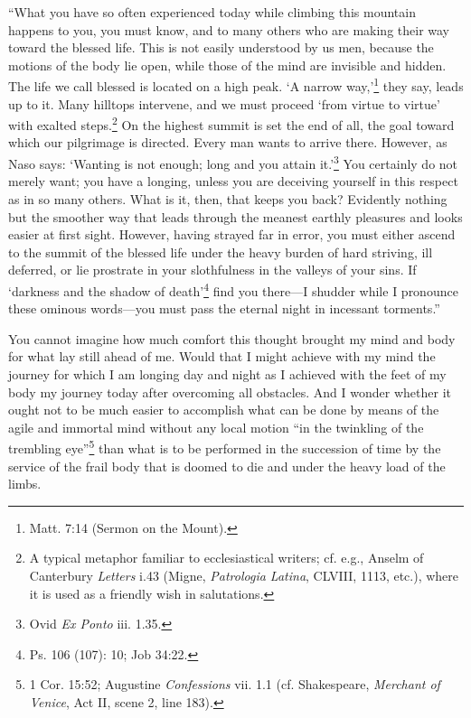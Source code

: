 ``What you have so often experienced today while climbing this
mountain happens to you, you must know, and to many others who are
making their way toward the blessed life. This  is not easily
understood by us men, because the motions of the body lie open, while
those of the mind are invisible and hidden. The life we call blessed
is located on a high peak. `A narrow way,'\footnote{Matt. 7:14 (Sermon
on the Mount).} they say, leads up to it. Many hilltops intervene,
and we must proceed `from virtue to virtue' with exalted
steps.\footnote{A typical metaphor familiar to ecclesiastical writers;
cf. e.g., Anselm of Canterbury \textit{Letters} i.43 (Migne,
\textit{Patrologia Latina}, CLVIII, 1113, etc.), where it is used as a
friendly wish in salutations.} On the highest summit is set the end of
all, the goal toward which our pilgrimage is directed. Every man wants
to arrive there. However, as Naso says: `Wanting is not enough; long
and you attain it.'\footnote{Ovid \textit{Ex Ponto} iii. 1.35.} You
certainly do not merely want; you have a longing, unless you are
deceiving yourself in this respect as in so many others. What is it,
then, that keeps you back? Evidently nothing but the smoother way that
leads through the meanest earthly pleasures and looks easier at first
sight. However, having strayed far in error, you must either ascend to
the summit of the blessed life under the heavy burden of hard
striving, ill deferred, or lie prostrate in your slothfulness in the
valleys of your sins. If `darkness and the shadow of
death'\footnote{Ps. 106 (107): 10; Job 34:22.} find you there---I
shudder while I pronounce these ominous words---you must pass the
eternal night in incessant torments.''

You cannot imagine how much comfort this thought brought my mind and
body for what lay still ahead of me. Would that I might achieve with
my mind the journey for which I am longing day and night as I achieved
with the feet of my body my journey today after overcoming all
obstacles. And I wonder whether it ought not to be much easier to
accomplish what can be done by means of the agile and immortal mind
without any local motion ``in the twinkling of the trembling
eye''\footnote{1 Cor. 15:52; Augustine \textit{Confessions} vii. 1.1
(cf. Shakespeare, \textit{Merchant of Venice}, Act II, scene 2, line
183).} than what is to be performed in the succession of time by the
service  of the frail body that is doomed to die and under
the heavy load of the limbs.

